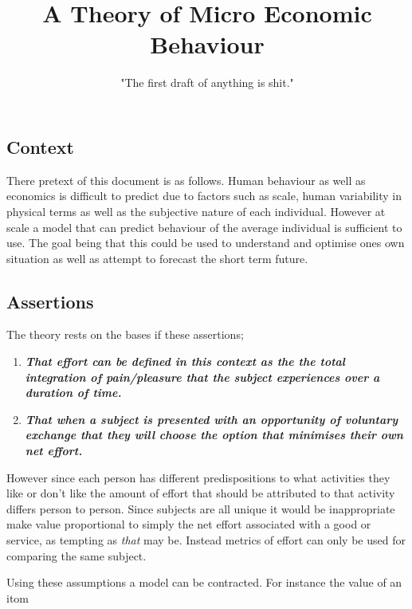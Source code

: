 \documentclass[]{article}
\title{A Theory of Micro Economic Behaviour}
\author{"The first draft of anything is shit."}
\begin{document}
\maketitle
\newpage




\subsection{Context}

There pretext of this document is as  follows. Human behaviour as well as economics is difficult to predict due to factors such as scale, human variability in physical terms as well as the subjective nature of each individual. However at scale a model that can predict behaviour of the average individual is sufficient to use. The goal being that this could be used to understand and optimise ones own situation as well as attempt to forecast the short term future.

\subsection{Assertions}

The theory rests on the bases if these assertions;
\begin{enumerate}
  \item \textbf{\textit{That effort can be defined in this context as the the total integration of pain/pleasure that the subject experiences over a duration of time.}}
  \item \textbf{ \textit{That when a subject is presented with an opportunity of voluntary exchange that they will choose the option that minimises their own net effort.}}

\end{enumerate}

However since each person has different predispositions to what activities they like or don't like the amount of effort that should be attributed to that activity differs person to person. Since subjects are all unique it would be inappropriate make value proportional to simply the net effort associated with a good or service, as tempting as \textit{that} may be. Instead metrics of effort can only be used for comparing the same subject.  

Using these assumptions a model can be contracted. For instance the value of an itom 
\end{document}
